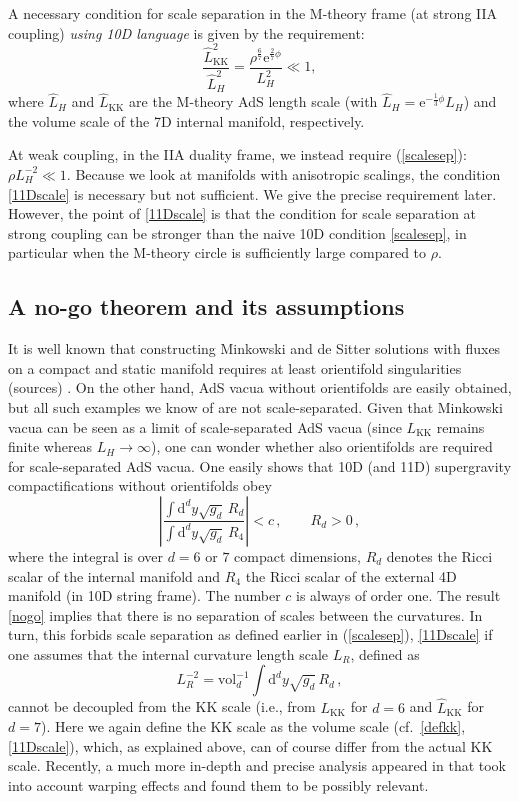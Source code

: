 \documentclass[11pt]{article}
\newcommand{\be}{\begin{equation}}
\newcommand{\ee}{\end{equation}}
\def\be{\begin{equation}}
\def\ee{\end{equation}}
\renewcommand{\[}{\left[}
\renewcommand{\]}{\right]}
\renewcommand{\(}{\left(}
\renewcommand{\)}{\right)}
\renewcommand{\d}{\textrm{d}}
\newcommand{\e}{\textrm{e}}
\newcommand{\<}{\langle}
\renewcommand{\>}{\rangle}
\begin{document}
A necessary condition for scale separation in the M-theory frame (at strong IIA coupling) \emph{using 10D language} is given by the requirement:
\be\label{11Dscale}
\frac{\hat L^2_\text{KK}}{\hat L^{2}_{H}} = \frac{\rho^{\frac67}\e^{\frac27 \phi} }{L^{2}_{H}} \ll 1,
\ee
where $\hat{L}_H$ and $\hat{L}_\text{KK}$ are the M-theory AdS length scale (with $\hat L_H=\e^{-\frac13\phi}L_H$) and the volume scale of the 7D internal manifold, respectively.

At weak coupling, in the IIA duality frame, we instead require (\ref{scalesep}): $\rho L^{-2}_{H}\ll 1$. Because we look at manifolds with anisotropic scalings, the condition \eqref{11Dscale} is necessary but not sufficient. We give the precise requirement later.
However, the point of \eqref{11Dscale} is that the condition for scale separation at strong coupling can be stronger than the naive 10D condition \eqref{scalesep}, in particular when the M-theory circle is sufficiently large compared to $\rho$.

 
\subsection{A no-go theorem and its assumptions}
\label{sec:nogo}

It is well known that constructing Minkowski and de Sitter solutions with fluxes on a compact and static manifold requires at least orientifold singularities (sources) \cite{Maldacena:2000mw}. On the other hand, AdS vacua without orientifolds are easily obtained, but all such examples we know of are not scale-separated. Given that Minkowski vacua can be seen as a limit of scale-separated AdS vacua (since $L_\text{KK}$ remains finite whereas $L_H\rightarrow \infty$), one can wonder whether also orientifolds are required for scale-separated AdS vacua. One easily shows that 10D (and 11D) supergravity compactifications without orientifolds obey \cite{Gautason:2015tig} 
\be\label{nogo}
\left|\frac{\int \d^d y \sqrt{g_d}\, R_d}{\int \d^d y \sqrt{g_d}\, R_4}\right| < c \,, \qquad  R_d >0\,,
\ee
where the integral is over $d=6$ or $7$ compact dimensions, $R_d$ denotes the Ricci scalar of the internal manifold and $R_4$ the Ricci scalar of the external 4D manifold (in 10D string frame).
The number $c$ is always of order one. The result \eqref{nogo} implies that there is no separation of scales between the curvatures. In turn, this forbids scale separation as defined earlier in (\ref{scalesep}), \eqref{11Dscale} if one assumes that the internal curvature length scale $L_R$, defined as
\be
L_R^{-2} = \text{vol}_d^{-1}\int \d^d y \sqrt{g_d}\, R_d\,, \label{assump}
\ee
cannot be decoupled from the KK scale (i.e., from $L_\text{KK}$ for $d=6$ and $\hat L_\text{KK}$ for $d=7$). Here we again define the KK scale as the volume scale (cf.~\eqref{defkk}, \eqref{11Dscale}), which, as explained above, can of course differ from the actual KK scale. Recently, a much more in-depth and precise analysis appeared in \cite{DeLuca:2021mcj} that took into account warping effects and found them to be possibly relevant.  
\end{document}
